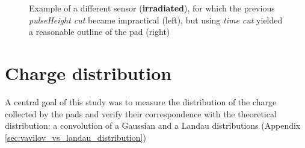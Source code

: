 \begin{figure}[!ht]
    \centering
    \hfill
    \centering
    \caption{Example of a different sensor (\textbf{irradiated}), for which the previous \textit{pulseHeight cut} became impractical (left), but using \textit{time cut} yielded a reasonable outline of the pad (right)}
\end{figure}


\section{Charge distribution}

A central goal of this study was to measure the distribution of the charge collected by the pads and verify their correspondence with the theoretical distribution: a convolution of a Gaussian and a Landau distributions (Appendix \ref{sec:vavilov_vs_landau_distribution})

